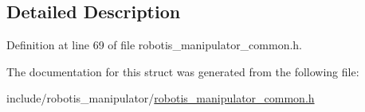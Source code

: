 \subsection{Detailed Description}


Definition at line 69 of file robotis\+\_\+manipulator\+\_\+common.\+h.



The documentation for this struct was generated from the following file\+:\begin{DoxyCompactItemize}
\item 
include/robotis\+\_\+manipulator/\hyperlink{robotis__manipulator__common_8h}{robotis\+\_\+manipulator\+\_\+common.\+h}\end{DoxyCompactItemize}
